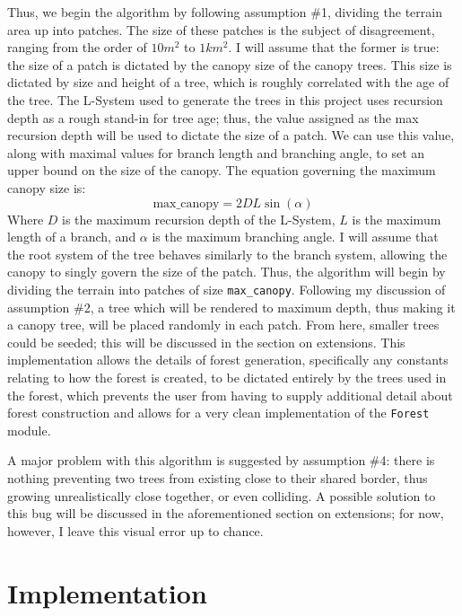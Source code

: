 \documentclass{article}
\newcommand{\tab}{\hspace*{2em}}
\begin{document}
    \tab Thus, we begin the algorithm by following assumption \#1, dividing the terrain area up
into patches. The size of these patches is the subject of disagreement, ranging from the order of
$10m^{2}$\cite{moorcroft01} to $1km^{2}$\cite{bugmann01}. I will assume that the former is true:
the size of a patch is dictated by the canopy size of the canopy trees. This size is dictated by
size and height of a tree, which is roughly correlated with the age of the tree. The L-System used
to generate the trees in this project uses recursion depth as a rough stand-in for tree age; thus,
the value assigned as the max recursion depth will be used to dictate the size of a patch. We can
use this value, along with maximal values for branch length and branching angle, to set an upper
bound on the size of the canopy. The equation governing the maximum canopy size is:
\begin{displaymath}
    \text{max\_canopy} = 2  D  L \sin(\alpha)
\end{displaymath}
Where $D$ is the maximum recursion depth of the L-System, $L$ is the maximum length of a branch,
and $\alpha$ is the maximum branching angle. I will assume that the root system of the tree
behaves similarly to the branch system, allowing the canopy to singly govern the size of the patch.
Thus, the algorithm will begin by dividing the terrain into patches of size \verb|max_canopy|.
Following my discussion of assumption \#2, a tree which will be rendered to maximum depth, thus
making it a canopy tree, will be placed randomly in each patch. From here, smaller trees could be
seeded; this will be discussed in the section on extensions. This implementation allows the details
of forest generation, specifically any constants relating to how the forest is created, to be
dictated entirely by the trees used in the forest, which prevents the user from having to supply
additional detail about forest construction and allows for a very clean implementation of the
\verb|Forest| module.

    \tab A major problem with this algorithm is suggested by assumption \#4: there is nothing
preventing two trees from existing close to their shared border, thus growing unrealistically close
together, or even colliding. A possible solution to this bug will be discussed in the
aforementioned section on extensions; for now, however, I leave this visual error up to chance.

    \section{Implementation}
\end{document}
